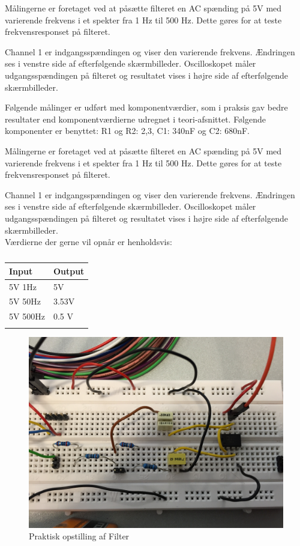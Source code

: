 Målingerne er foretaget ved at påsætte filteret en AC spænding på 5V med varierende frekvens i et spekter fra 1 Hz til 500 Hz. Dette gøres for at teste frekvensresponset på filteret. 

Channel 1 er indgangsspændingen og viser den varierende frekvens. Ændringen ses i venstre side af efterfølgende skærmbilleder. 
Oscilloskopet måler udgangsspændingen på filteret og resultatet vises i højre side af efterfølgende skærmbilleder. 

Følgende målinger er udført med komponentværdier, som i praksis gav bedre resultater end komponentværdierne udregnet i teori-afsnittet. Følgende komponenter er benyttet: 
R1 og R2: 2,3, C1: 340nF og C2: 680nF. 

Målingerne er foretaget ved at påsætte filteret en AC spænding på 5V med varierende frekvens i et spekter fra 1 Hz til 500 Hz. Dette gøres for at teste frekvensresponset på filteret. 

Channel 1 er indgangsspændingen og viser den varierende frekvens. Ændringen ses i venstre side af efterfølgende skærmbilleder. 
Oscilloskopet måler udgangsspændingen på filteret og resultatet vises i højre side af efterfølgende skærmbilleder. \\
Værdierne der gerne vil opnår er henholdsvis:


\begin{longtabu} to 
	\textbf{Input} & \textbf{Output} \\[-1ex]
	\midrule
	5V 1Hz & 5V \\[-1ex]
	5V 50Hz	& 3.53V\\[-1ex]
	5V 500Hz & 0.5 V \\[-1ex]
	\caption{}	
\end{longtabu}

	

\begin{figure}[H]
	\centering
	\includegraphics[width=1\textwidth]{Figurer/Filterblok}
	\caption{Praktisk opstilling af Filter}
	\label{fig:Filter}
\end{figure}

